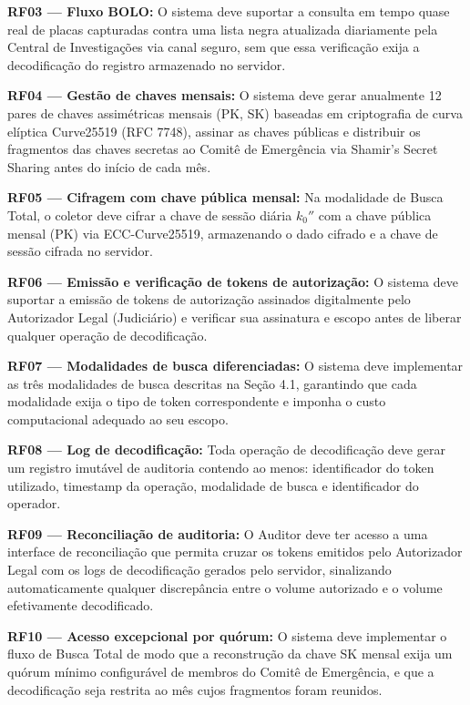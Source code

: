 \noindent\textbf{RF03 — Fluxo BOLO:} O sistema deve suportar a consulta em tempo quase real de placas capturadas contra uma lista negra atualizada diariamente pela Central de Investigações via canal seguro, sem que essa verificação exija a decodificação do registro armazenado no servidor.

\noindent\textbf{RF04 — Gestão de chaves mensais:} O sistema deve gerar anualmente 12 pares de chaves assimétricas mensais (PK, SK) baseadas em criptografia de curva elíptica Curve25519 (RFC 7748), assinar as chaves públicas e distribuir os fragmentos das chaves secretas ao Comitê de Emergência via Shamir's Secret Sharing antes do início de cada mês.

\noindent\textbf{RF05 — Cifragem com chave pública mensal:} Na modalidade de Busca Total, o coletor deve cifrar a chave de sessão diária $k_0''$ com a chave pública mensal (PK) via ECC-Curve25519, armazenando o dado cifrado e a chave de sessão cifrada no servidor.

\noindent\textbf{RF06 — Emissão e verificação de tokens de autorização:} O sistema deve suportar a emissão de tokens de autorização assinados digitalmente pelo Autorizador Legal (Judiciário) e verificar sua assinatura e escopo antes de liberar qualquer operação de decodificação.

\noindent\textbf{RF07 — Modalidades de busca diferenciadas:} O sistema deve implementar as três modalidades de busca descritas na Seção 4.1, garantindo que cada modalidade exija o tipo de token correspondente e imponha o custo computacional adequado ao seu escopo.

\noindent\textbf{RF08 — Log de decodificação:} Toda operação de decodificação deve gerar um registro imutável de auditoria contendo ao menos: identificador do token utilizado, timestamp da operação, modalidade de busca e identificador do operador.

\noindent\textbf{RF09 — Reconciliação de auditoria:} O Auditor deve ter acesso a uma interface de reconciliação que permita cruzar os tokens emitidos pelo Autorizador Legal com os logs de decodificação gerados pelo servidor, sinalizando automaticamente qualquer discrepância entre o volume autorizado e o volume efetivamente decodificado.

\noindent\textbf{RF10 — Acesso excepcional por quórum:} O sistema deve implementar o fluxo de Busca Total de modo que a reconstrução da chave SK mensal exija um quórum mínimo configurável de membros do Comitê de Emergência, e que a decodificação seja restrita ao mês cujos fragmentos foram reunidos.

